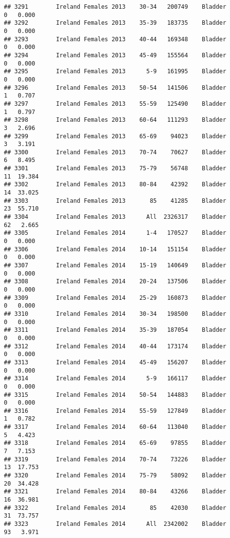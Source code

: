 \documentclass[
]{article}
\begin{document}
\begin{verbatim}
## 3291        Ireland Females 2013    30-34   200749    Bladder      0   0.000
## 3292        Ireland Females 2013    35-39   183735    Bladder      0   0.000
## 3293        Ireland Females 2013    40-44   169348    Bladder      0   0.000
## 3294        Ireland Females 2013    45-49   155564    Bladder      0   0.000
## 3295        Ireland Females 2013      5-9   161995    Bladder      0   0.000
## 3296        Ireland Females 2013    50-54   141506    Bladder      1   0.707
## 3297        Ireland Females 2013    55-59   125490    Bladder      1   0.797
## 3298        Ireland Females 2013    60-64   111293    Bladder      3   2.696
## 3299        Ireland Females 2013    65-69    94023    Bladder      3   3.191
## 3300        Ireland Females 2013    70-74    70627    Bladder      6   8.495
## 3301        Ireland Females 2013    75-79    56748    Bladder     11  19.384
## 3302        Ireland Females 2013    80-84    42392    Bladder     14  33.025
## 3303        Ireland Females 2013       85    41285    Bladder     23  55.710
## 3304        Ireland Females 2013      All  2326317    Bladder     62   2.665
## 3305        Ireland Females 2014      1-4   170527    Bladder      0   0.000
## 3306        Ireland Females 2014    10-14   151154    Bladder      0   0.000
## 3307        Ireland Females 2014    15-19   140649    Bladder      0   0.000
## 3308        Ireland Females 2014    20-24   137506    Bladder      0   0.000
## 3309        Ireland Females 2014    25-29   160873    Bladder      0   0.000
## 3310        Ireland Females 2014    30-34   198500    Bladder      0   0.000
## 3311        Ireland Females 2014    35-39   187054    Bladder      0   0.000
## 3312        Ireland Females 2014    40-44   173174    Bladder      0   0.000
## 3313        Ireland Females 2014    45-49   156207    Bladder      0   0.000
## 3314        Ireland Females 2014      5-9   166117    Bladder      0   0.000
## 3315        Ireland Females 2014    50-54   144883    Bladder      0   0.000
## 3316        Ireland Females 2014    55-59   127849    Bladder      1   0.782
## 3317        Ireland Females 2014    60-64   113040    Bladder      5   4.423
## 3318        Ireland Females 2014    65-69    97855    Bladder      7   7.153
## 3319        Ireland Females 2014    70-74    73226    Bladder     13  17.753
## 3320        Ireland Females 2014    75-79    58092    Bladder     20  34.428
## 3321        Ireland Females 2014    80-84    43266    Bladder     16  36.981
## 3322        Ireland Females 2014       85    42030    Bladder     31  73.757
## 3323        Ireland Females 2014      All  2342002    Bladder     93   3.971

\end{verbatim}
\end{document}

